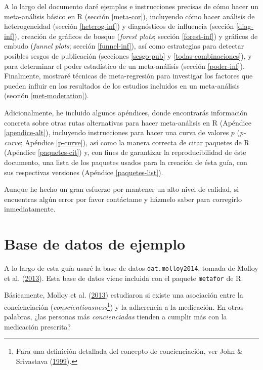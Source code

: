 \documentclass[
  bookmarksnumbered]{article}
\begin{document}
A lo largo del documento daré ejemplos e instrucciones precisas de cómo hacer un meta-análisis básico en R (sección \ref{meta-cor}), incluyendo cómo hacer análisis de heterogeneidad (sección \ref{heterog-inf}) y diagnósticos de influencia (sección \ref{diag-inf}), creación de gráficos de bosque (\emph{forest plots}; sección \ref{forest-inf}) y gráficos de embudo (\emph{funnel plots}; sección \ref{funnel-inf}), así como estrategias para detectar posibles sesgos de publicación (secciones \ref{sesgo-pub} y \ref{todas-combinaciones}), y para determinar el poder estadístico de un meta-análisis (sección \ref{poder-inf}). Finalmente, mostraré técnicas de meta-regresión para investigar los factores que pueden influir en los resultados de los estudios incluidos en un meta-análisis (sección \ref{met-moderation}).

Adicionalmente, he incluido algunos apéndices, donde encontrarás información concreta sobre otras rutas alternativas para hacer meta-análisis en R (Apéndice \ref{apendice-alt}), incluyendo instrucciones para hacer una curva de valores \(p\) (\emph{p-curve}; Apéndice \ref{p-curve}), así como la manera correcta de citar paquetes de R (Apéndice \ref{paquetes-cit}) y, con fines de garantizar la reproducibilidad de éste documento, una lista de los paquetes usados para la creación de ésta guía, con sus respectivas versiones (Apéndice \ref{paquetes-list}).

Aunque he hecho un gran esfuerzo por mantener un alto nivel de calidad, si encuentras algún error por favor contáctame y házmelo saber para corregirlo inmediatamente.

\hypertarget{base-de-datos-de-ejemplo}{%
\section{Base de datos de ejemplo}\label{base-de-datos-de-ejemplo}}

A lo largo de esta guía usaré la base de datos \texttt{dat.molloy2014}, tomada de Molloy et al. (\protect\hyperlink{ref-molloy2013}{2013}). Esta base de datos viene incluida con el paquete \texttt{metafor} de R.

Básicamente, Molloy et al. (\protect\hyperlink{ref-molloy2013}{2013}) estudiaron si existe una asociación entre la concienciación (\emph{conscientiousness}\footnote{Para una definición detallada del concepto de concienciación, ver John \& Srivastava (\protect\hyperlink{ref-johnBigFiveTrait1999}{1999}).}) y la adherencia a la medicación. En otras palabras, ¿las personas más \emph{concienciadas} tienden a cumplir más con la medicación prescrita?
\end{document}
